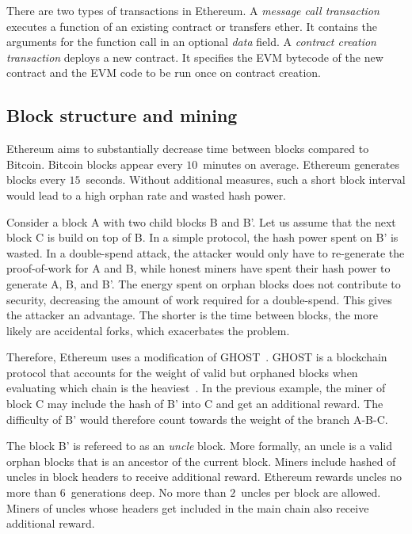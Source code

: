 There are two types of transactions in Ethereum.
A \emph{message call transaction} executes a function of an existing contract or transfers ether.
It contains the arguments for the function call in an optional \emph{data} field.
A \emph{contract creation transaction} deploys a new contract.
It specifies the EVM bytecode of the new contract and the EVM code to be run once on contract creation.


\subsection{Block structure and mining}

Ethereum aims to substantially decrease time between blocks compared to Bitcoin.
Bitcoin blocks appear every $10$~minutes on average.
Ethereum generates blocks every $15$~seconds.
Without additional measures, such a short block interval would lead to a high orphan rate and wasted hash power.

Consider a block A with two child blocks B and B'.
Let us assume that the next block C is build on top of B.
In a simple protocol, the hash power spent on B' is wasted.
In a double-spend attack, the attacker would only have to re-generate the proof-of-work for A and B, while honest miners have spent their hash power to generate A, B, and B'.
The energy spent on orphan blocks does not contribute to security, decreasing the amount of work required for a double-spend.
This gives the attacker an advantage.
The shorter is the time between blocks, the more likely are accidental forks, which exacerbates the problem.

Therefore, Ethereum uses a modification of GHOST~\cite{Sompolinsky2013, EthdocsMining}.
GHOST is a blockchain protocol that accounts for the weight of valid but orphaned blocks when evaluating which chain is the heaviest~\cite{Wuille2017, Johnson2017}.
In the previous example, the miner of block C may include the hash of B' into C and get an additional reward.
The difficulty of B' would therefore count towards the weight of the branch A-B-C.

The block B' is refereed to as an \textit{uncle} block.
More formally, an uncle is a valid orphan blocks that is an ancestor of the current block.
Miners include hashed of uncles in block headers to receive additional reward.
Ethereum rewards uncles no more than 6~generations deep.
No more than $2$~uncles per block are allowed.
Miners of uncles whose headers get included in the main chain also receive additional reward.

